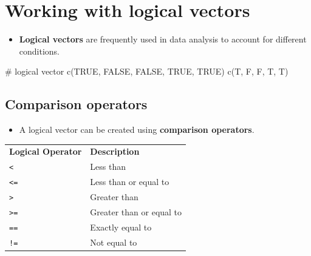 \documentclass[
  letterpaper,
  DIV=11,
  numbers=noendperiod]{scrreprt}
\newenvironment{Shaded}{\begin{snugshade}}{\end{snugshade}}
\newcommand{\CommentTok}[1]{\textcolor[rgb]{0.37,0.37,0.37}{#1}}
\newcommand{\ConstantTok}[1]{\textcolor[rgb]{0.56,0.35,0.01}{#1}}
\newcommand{\FunctionTok}[1]{\textcolor[rgb]{0.28,0.35,0.67}{#1}}
\newcommand{\NormalTok}[1]{\textcolor[rgb]{0.00,0.23,0.31}{#1}}
\providecommand{\tightlist}{%
  \setlength{\itemsep}{0pt}\setlength{\parskip}{0pt}}\usepackage{longtable,booktabs,array}
\begin{document}
\section{Working with logical
vectors}\label{working-with-logical-vectors}

\begin{itemize}
\tightlist
\item
  \textbf{Logical vectors} are frequently used in data analysis to
  account for different conditions.
\end{itemize}

\begin{Shaded}
\begin{Highlighting}[]
\CommentTok{\# logical vector}
\FunctionTok{c}\NormalTok{(}\ConstantTok{TRUE}\NormalTok{, }\ConstantTok{FALSE}\NormalTok{, }\ConstantTok{FALSE}\NormalTok{, }\ConstantTok{TRUE}\NormalTok{, }\ConstantTok{TRUE}\NormalTok{)}
\FunctionTok{c}\NormalTok{(T, F, F, T, T)}
\end{Highlighting}
\end{Shaded}

\subsection{Comparison operators}\label{comparison-operators}

\begin{itemize}
\tightlist
\item
  A logical vector can be created using \textbf{comparison operators}.
\end{itemize}

\begin{longtable}[]{@{}ll@{}}
\toprule\noalign{}
\endhead
\bottomrule\noalign{}
\endlastfoot
\textbf{Logical Operator} & \textbf{Description} \\
\texttt{\textless{}} & Less than \\
\texttt{\textless{}=} & Less than or equal to \\
\texttt{\textgreater{}} & Greater than \\
\texttt{\textgreater{}=} & Greater than or equal to \\
\texttt{==} & Exactly equal to \\
\texttt{!=} & Not equal to \\
\end{longtable}
\end{document}
